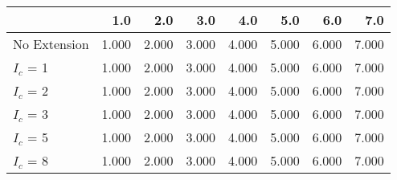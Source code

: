 \begin{tabular}{lrrrrrrr}
\toprule
{} &   1.0 &   2.0 &   3.0 &   4.0 &   5.0 &   6.0 &   7.0 \\
\midrule
No Extension & 1.000 & 2.000 & 3.000 & 4.000 & 5.000 & 6.000 & 7.000 \\
$I_c$ = 1    & 1.000 & 2.000 & 3.000 & 4.000 & 5.000 & 6.000 & 7.000 \\
$I_c$ = 2    & 1.000 & 2.000 & 3.000 & 4.000 & 5.000 & 6.000 & 7.000 \\
$I_c$ = 3    & 1.000 & 2.000 & 3.000 & 4.000 & 5.000 & 6.000 & 7.000 \\
$I_c$ = 5    & 1.000 & 2.000 & 3.000 & 4.000 & 5.000 & 6.000 & 7.000 \\
$I_c$ = 8    & 1.000 & 2.000 & 3.000 & 4.000 & 5.000 & 6.000 & 7.000 \\
\bottomrule
\end{tabular}
